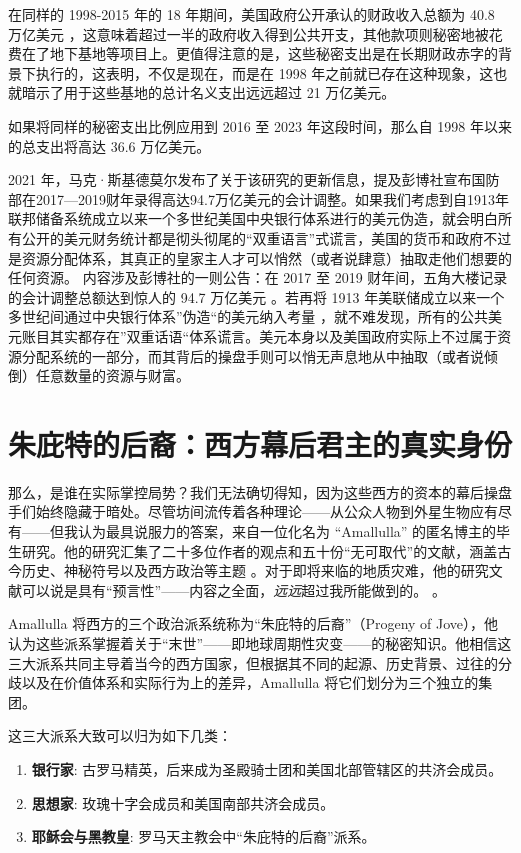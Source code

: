 \documentclass[10pt,twocolumn,letterpaper]{article}
\begin{document}
在同样的 1998-2015 年的 18 年期间，美国政府公开承认的财政收入总额为 40.8 万亿美元 \cite{15}，这意味着超过一半的政府收入得到公共开支，其他款项则秘密地被花费在了地下基地等项目上。更值得注意的是，这些秘密支出是在长期财政赤字的背景下执行的，这表明，不仅是现在，而是在 1998 年之前就已存在这种现象，这也就暗示了用于这些基地的总计名义支出远远超过 21 万亿美元。

如果将同样的秘密支出比例应用到 2016 至 2023 年这段时间，那么自 1998 年以来的总支出将高达 36.6 万亿美元。

2021 年，马克·斯基德莫尔发布了关于该研究的更新信息，提及彭博社宣布国防部在2017—2019财年录得高达94.7万亿美元的会计调整\cite{17,18}。如果我们考虑到自1913年联邦储备系统成立以来一个多世纪美国中央银行体系进行的美元伪造\cite{37}，就会明白所有公开的美元财务统计都是彻头彻尾的“双重语言”式谎言，美国的货币和政府不过是资源分配体系，其真正的皇家主人才可以悄然（或者说肆意）抽取走他们想要的任何资源。
内容涉及彭博社的一则公告：在 2017 至 2019 财年间，五角大楼记录的会计调整总额达到惊人的 94.7 万亿美元 \cite{17,18}。若再将 1913 年美联储成立以来一个多世纪间通过中央银行体系”伪造“的美元纳入考量 \cite{37}，就不难发现，所有的公共美元账目其实都存在”双重话语“体系谎言。美元本身以及美国政府实际上不过属于资源分配系统的一部分，而其背后的操盘手则可以悄无声息地从中抽取（或者说倾倒）任意数量的资源与财富。

\section{朱庇特的后裔：西方幕后君主的真实身份}
那么，是谁在实际掌控局势？我们无法确切得知，因为这些西方的资本的幕后操盘手们始终隐藏于暗处。尽管坊间流传着各种理论——从公众人物到外星生物应有尽有——但我认为最具说服力的答案，来自一位化名为 “Amallulla” 的匿名博主的毕生研究。他的研究汇集了二十多位作者的观点和五十份“无可取代”的文献，涵盖古今历史、神秘符号以及西方政治等主题 \cite{33,34}。对于即将来临的地质灾难，他的研究文献可以说是具有“预言性”——内容之全面，\textit{远远}超过我所能做到的。 \cite{33,34}。

Amallulla 将西方的三个政治派系统称为“朱庇特的后裔”（Progeny of Jove），他认为这些派系掌握着关于“末世”——即地球周期性灾变——的秘密知识。他相信这三大派系共同主导着当今的西方国家，但根据其不同的起源、历史背景、过往的分歧以及在价值体系和实际行为上的差异，Amallulla 将它们划分为三个独立的集团。

这三大派系大致可以归为如下几类：

\begin{flushleft}
\begin{enumerate}
    \item \textbf{银行家}: 古罗马精英，后来成为圣殿骑士团和美国北部管辖区的共济会成员。
    \item \textbf{思想家}: 玫瑰十字会成员和美国南部共济会成员。
    \item \textbf{耶稣会与黑教皇}: 罗马天主教会中“朱庇特的后裔”派系。
\end{enumerate}
\end{flushleft}
\end{document}

